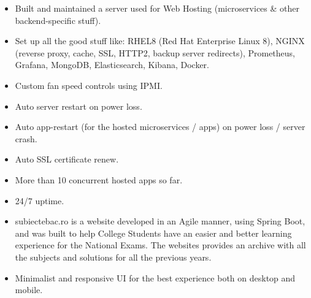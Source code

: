 \documentclass[10pt,a4paper,ragged2e]{resume}
\begin{document}
    \smallskip
    \smallskip
    \smallskip
    \smallskip
    \smallskip
    \smallskip



    \begin{fullwidth}
        \begin{itemize}
            \item Built and maintained a server used for Web Hosting (microservices \& other backend-specific stuff).
            \item Set up all the good stuff like: RHEL8 (Red Hat Enterprise Linux 8), NGINX (reverse proxy, cache, SSL, HTTP2, backup server redirects), Prometheus, Grafana, MongoDB, Elasticsearch, Kibana, Docker.
            \item Custom fan speed controls using IPMI.
            \item Auto server restart on power loss.
            \item Auto app-restart (for the hosted microservices / apps) on power loss / server crash.
            \item Auto SSL certificate renew.
            \item More than 10 concurrent hosted apps so far.
            \item 24/7 uptime.
            \smallskip
        \end{itemize}
        \divider

        \begin{itemize}
            \item subiectebac.ro is a website developed in an Agile manner, using Spring Boot, and was built to help College Students have an easier and better learning experience for the National Exams.
            \itme The websites provides an archive with all the subjects and solutions for all the previous years.
            \item Minimalist and responsive UI for the best experience both on desktop and mobile.
            \smallskip
        \end{itemize}
        \divider


\end{fullwidth}
\end{document}
